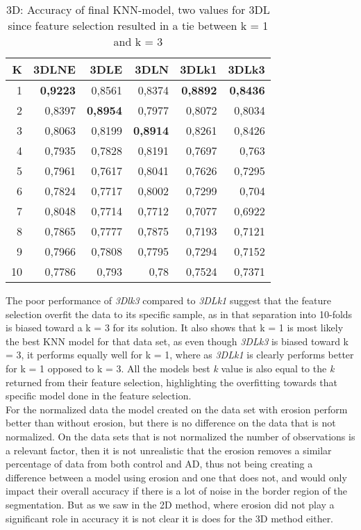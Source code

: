 \begin{table}[H]
  \centering
    \begin{tabular}{|r|r|r|r|r|r|}
    \hline
    K     & 3DLNE & 3DLE  & 3DLN  & 3DLk1 & 3DLk3 \\ \hline
    1     & \textbf{0,9223} & 0,8561 & 0,8374 & \textbf{0,8892} & \textbf{0,8436} \\ \hline
    2     & 0,8397 & \textbf{0,8954} & 0,7977 & 0,8072 & 0,8034 \\ \hline
    3     & 0,8063 & 0,8199 & \textbf{0,8914} & 0,8261 & 0,8426 \\ \hline
    4     & 0,7935 & 0,7828 & 0,8191 & 0,7697 & 0,763 \\ \hline
    5     & 0,7961 & 0,7617 & 0,8041 & 0,7626 & 0,7295 \\ \hline
    6     & 0,7824 & 0,7717 & 0,8002 & 0,7299 & 0,704 \\ \hline
    7     & 0,8048 & 0,7714 & 0,7712 & 0,7077 & 0,6922 \\ \hline
    8     & 0,7865 & 0,7777 & 0,7875 & 0,7193 & 0,7121 \\ \hline
    9     & 0,7966 & 0,7808 & 0,7795 & 0,7294 & 0,7152 \\ \hline
    10    & 0,7786 & 0,793 & 0,78  & 0,7524 & 0,7371 \\ \hline
    \end{tabular}%
  \caption{3D: Accuracy of final KNN-model, two values for 3DL since feature selection resulted in a tie between k = 1 and k = 3}\label{tab:3DFinalModel}%
\end{table}%

The poor performance of \emph{3Dlk3} compared to \emph{3DLk1} suggest that the feature selection overfit the data to its specific sample, as in that separation into 10-folds is biased toward a k = 3 for its solution. It also shows that k = 1 is most likely the best KNN model for that data set, as even though \emph{3DLk3} is biased toward k = 3, it performs equally well for k = 1, where as \emph{3DLk1} is clearly performs better for k = 1 opposed to k = 3. All the models best \emph{k} value is also equal to the \emph{k} returned from their feature selection, highlighting the overfitting towards that specific model done in the feature selection.\\
For the normalized data the model created on the data set with erosion perform better than without erosion, but there is no difference on the data that is not normalized. On the data sets that is not normalized the number of observations is a relevant factor, then it is not unrealistic that the erosion removes a similar percentage of data from both control and AD, thus not being creating a difference between a model using erosion and one that does not, and would only impact their overall accuracy if there is a lot of noise in the border region of the segmentation. But as we saw in the 2D method, where erosion did not play a significant role in accuracy it is not clear it is does for the 3D method either.

